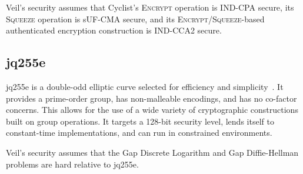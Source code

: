 Veil's security assumes that Cyclist's \textsc{Encrypt} operation is IND-CPA secure, its
\textsc{Squeeze} operation is sUF-CMA secure, and its \textsc{Encrypt}/\textsc{Squeeze}-based
authenticated encryption construction is IND-CCA2 secure.

\subsection{jq255e}\label{subsec:jq255e}

jq255e is a double-odd elliptic curve selected for efficiency and
simplicity~\cite{pornin2020do,pornin2022}\@. It provides a prime-order group, has non-malleable
encodings, and has no co-factor concerns. This allows for the use of a wide variety of cryptographic
constructions built on group operations. It targets a 128-bit security level, lends itself to
constant-time implementations, and can run in constrained environments.

Veil's security assumes that the Gap Discrete Logarithm and Gap Diffie-Hellman problems are hard
relative to jq255e.
